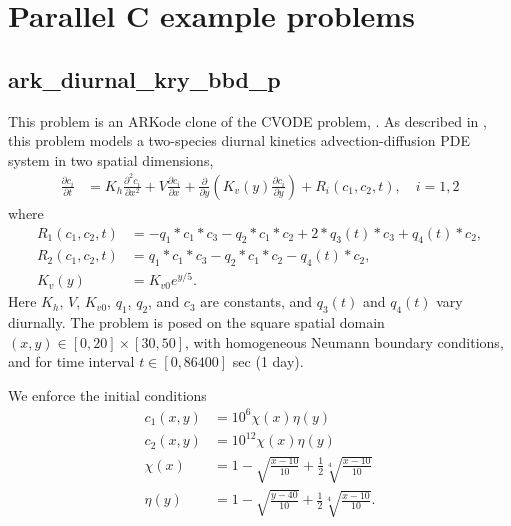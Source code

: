 \documentclass[letterpaper,10pt,english]{sphinxmanual}
\begin{document}
\chapter{Parallel C example problems}
\label{\detokenize{c_parallel::doc}}\label{\detokenize{c_parallel:parallel-c-example-problems}}\label{\detokenize{c_parallel:parallel-c}}

\section{ark\_diurnal\_kry\_bbd\_p}
\label{\detokenize{c_parallel:ark-diurnal-kry-bbd-p}}\label{\detokenize{c_parallel:id1}}
This problem is an ARKode clone of the CVODE problem,
.  As described in \label{\detokenize{c_parallel:id2}}{\hyperref[\detokenize{References:hsr2017}]{\sphinxcrossref{{[}HSR2017{]}}}}, this problem
models a two-species diurnal kinetics advection-diffusion PDE system
in two spatial dimensions,
\begin{equation*}
\begin{split}\frac{\partial c_i}{\partial t} &=
  K_h \frac{\partial^2 c_i}{\partial x^2} +
  V \frac{\partial     c_i}{\partial x} +
  \frac{\partial}{\partial y}\left( K_v(y)
  \frac{\partial c_i}{\partial y}\right) +
  R_i(c_1,c_2,t),\quad i=1,2\end{split}
\end{equation*}
where
\begin{equation*}
\begin{split}R_1(c_1,c_2,t) &= -q_1*c_1*c_3 - q_2*c_1*c_2 + 2*q_3(t)*c_3 + q_4(t)*c_2, \\
R_2(c_1,c_2,t) &=  q_1*c_1*c_3 - q_2*c_1*c_2 - q_4(t)*c_2, \\
K_v(y) &= K_{v0} e^{y/5}.\end{split}
\end{equation*}
Here \(K_h\), \(V\), \(K_{v0}\), \(q_1\), \(q_2\),
and \(c_3\) are constants, and \(q_3(t)\) and \(q_4(t)\)
vary diurnally.  The problem is posed on the square spatial domain
\((x,y) \in [0,20]\times[30,50]\), with homogeneous Neumann
boundary conditions, and for time interval \(t\in [0,86400]\) sec
(1 day).

We enforce the initial conditions
\begin{equation*}
\begin{split}c_1(x,y) &=  10^6 \chi(x)\eta(y) \\
c_2(x,y) &=  10^{12} \chi(x)\eta(y) \\
\chi(x) &= 1 - \sqrt{\frac{x - 10}{10}} + \frac12 \sqrt[4]{\frac{x - 10}{10}} \\
\eta(y) &= 1 - \sqrt{\frac{y - 40}{10}} + \frac12 \sqrt[4]{\frac{x - 10}{10}}.\end{split}
\end{equation*}
\end{document}
